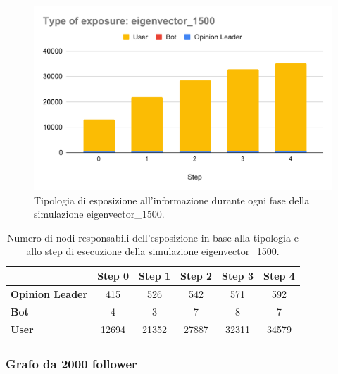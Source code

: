         \begin{figure}[H]
            \centering
            \includegraphics[width=.7\textwidth]{resources/charts/Type of exposure_ eigenvector_1500.pdf}
            \caption{Tipologia di esposizione all'informazione durante ogni fase della simulazione eigenvector\_1500.}
        \end{figure}
        
        \begin{table}[H]
            \centering
            \begin{tabular}{l|c|c|c|c|c}
                           & Step 0 & Step 1 & Step 2 & Step 3 & Step 4 \\ \hline
            \textbf{Opinion Leader} & 415    & 526    & 542    & 571    & 592    \\ \hline
            \textbf{Bot}            & 4      & 3      & 7      & 8      & 7      \\ \hline
            \textbf{User}           & 12694  & 21352  & 27887  & 32311  & 34579  \\
            \end{tabular}
            \caption{Numero di nodi responsabili dell'esposizione in base alla tipologia e allo step di esecuzione della simulazione eigenvector\_1500.}
        \end{table}

        \subsubsection{Grafo da 2000 follower}


